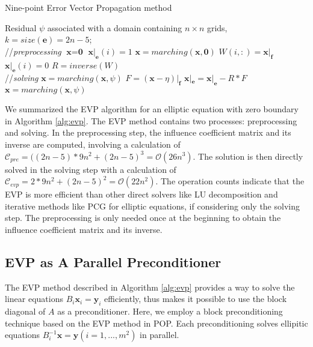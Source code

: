 \begin{algorithm}[!h]
\caption{Nine-point Error Vector Propagation method}
\label{alg:evp}
\begin{algorithmic}[1]
\REQUIRE Residual $\psi$ associated with a domain containing $n\times n$ grids, $k = size(\textbf{e})=2n-5$; \\
//\qquad \textit{preprocessing }
\STATE  $\textbf{x} = \textbf{0}$
\STATE $\textbf{x}|_\textbf{e}(i) = 1$
\STATE $\textbf{x} = marching(\textbf{x},\textbf{0})$
\STATE $W(i,:) = \textbf{x}|_\textbf{f}$
\STATE $\textbf{x}|_\textbf{e}(i) = 0$
\ENDFOR 
\STATE $R = inverse(W)$ \\
//\qquad \textit{solving }
\STATE $\textbf{x}= marching(\textbf{x},\psi)$
\STATE $F = (\textbf{x} - \eta)|_\textbf{f}$
\STATE $\textbf{x}|_\textbf{e} =\textbf{x}|_\textbf{e} - R*F$
\STATE $\textbf{x} = marching(\textbf{x},\psi)$
\end{algorithmic}
\end{algorithm}

We summarized the EVP algorithm for an elliptic equation with zero boundary in Algorithm \ref{alg:evp}. 
The EVP method contains two processes: preprocessing and solving. In the preprocessing step, the influence coefficient matrix
and its inverse are computed, involving a calculation of  $\mathcal{C}_{pre}= ((2n-5)* 9n^2 + (2n-5)^3 = \mathcal {O} (26n^3)$.
The solution is then directly solved in the solving step with a calculation of $\mathcal{C}_{evp}= 2* 9n^2 + (2n-5)^2 = \mathcal{O} (22n^2)$. 
The operation counts indicate that the EVP is more efficient than other direct solvers like LU decomposition
and iterative methods like PCG for elliptic equations, if considering only the solving step.
The preprocessing is only needed once at the beginning to obtain the influence coefficient matrix and its inverse.

\subsection{EVP as A Parallel Preconditioner}
The EVP method described in Algorithm \ref{alg:evp} provides a way to solve the linear equations $B_i \textbf{x}_i = \textbf{y}_i$ efficiently, 
thus makes it possible to use the block diagonal of $A$ as a preconditioner. 
Here, we employ a block preconditioning technique based on the EVP method in POP.
Each preconditioning solves ellipitic equations $B_i^{-1} \textbf{x} = \textbf{y}  (i=1,...,m^2)$ in parallel. 

